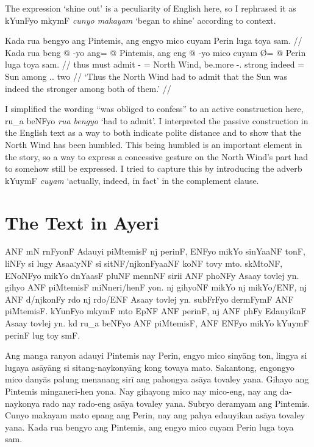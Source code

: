 \documentclass[12pt,paper=a4]{scrartcl}
\newcommand{\xayr}[3]{{\Tagati #1} \emph{#2} \enquote*{#3}}
\newenvironment{ayeri}{
    \doublespacing
    \begin{multicols}{2}
    \Tagati
}{
    \end{multicols} \par
}
\begin{document}
The expression `shine out' is a peculiarity of English here, so I rephrased it as \xayr{kYunFyo mkymF}{cunyo makayam}{began to shine} according to context.

\ex %
\begingl
	\glpreamble Kada rua bengyo ang Pintemis, ang engyo mico cuyam Perin luga toya sam. //
	\gla Kada rua beng @ -yo ang= @ Pintemis, ang eng @ -yo mico cuyam  Ø= @ Perin luga toya sam. //
	\glb thus must admit -\Tsg{} \Aarg{}= {North Wind}, \AgtT{} be.more -\Tsg{}.\N{} strong indeed \Top{}= Sun among \Tpl{}.\N{}.\Loc{} two //
	\glft `Thus the North Wind had to admit that the Sun was indeed the stronger among both of them.' //
\endgl
\xe

I simplified the wording \enquote{was obliged to confess} to an active construction here, \xayr{ru\_a beNFyo}{rua bengyo}{had to admit}. I interpreted the passive construction in the English text as a way to both indicate polite distance and to show that the North Wind has been humbled. This being humbled is an important element in the story, so a way to express a concessive gesture on the North Wind's part had to somehow still be expressed. I tried to capture this by introducing the adverb \xayr{kYuymF}{cuyam}{actually, indeed, in fact} in the complement clause.

\section{The Text in Ayeri}

\begin{ayeri}
\noindent ANF mN rnFyonF Adauyi piMtemisF nj perinF, ENFyo mikYo sinYaaNF tonF, liNFy si lugy AsaaːyNF si sitNF/njkonFyaaNF koNF tovy mto.
skMtoNF, ENoNFyo mikYo dnYaasF pluNF mennNF sirii ANF phoNFy Asaay tovlej yn.
gihyo ANF piM\-temisF miNneri/henF yon.
nj gihyoNF mikYo nj mikYo/ENF, nj ANF d/njkonFy rdo nj rdo/ENF Asaay tovlej yn.
subFrFyo dermFymF ANF piMtemisF.
kYunFyo mkymF mto EpNF ANF perinF, nj ANF phFy EdauyiknF Asaay tovlej yn.
kd ru\_a beNFyo ANF piMtemisF, ANF ENFyo mikYo kYuymF perinF lug toy smF.
\end{ayeri}

\noindent Ang manga ranyon adauyi Pintemis nay Perin, engyo mico sinyāng ton, lingya si lugaya asāyāng si sitang-naykonyāng kong tovaya mato.
Sakantong, engongyo mico danyās palung menanang sirī ang pahongya asāya tovaley yana.
Gihayo ang Pintemis minganeri-hen yona.
Nay gihayong mico nay mico-eng, nay ang da-naykonya rado nay rado-eng asāya tovaley yana.
Subryo deramyam ang Pintemis.
Cunyo makayam mato epang ang Perin, nay ang pahya edauyikan asāya tovaley yana.
Kada rua bengyo ang Pintemis, ang engyo mico cuyam Perin luga toya sam.\\
\end{document}
